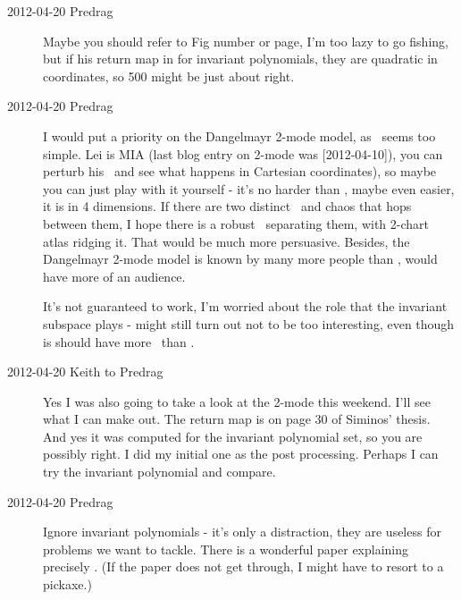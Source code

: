 \begin{description}
\item[2012-04-20 Predrag] Maybe you should refer to Fig number or page,
I'm too lazy to go fishing, but if his return map in for invariant
polynomials, they are quadratic in coordinates, so 500 might be just
about right.

\item[2012-04-20 Predrag] I would put a priority on the Dangelmayr 2-mode
model, as \cLe\ seems too simple. Lei is MIA (last blog entry on 2-mode
was [2012-04-10]), you can perturb his \reqva\ and see what happens in
Cartesian coordinates), so maybe you can just play with it yourself -
it's no harder than \cLe, maybe even easier, it is in 4 dimensions. If
there are two distinct \reqva\ and chaos that hops between them, I hope
there is a robust \chartBord\ separating them, with 2-chart atlas ridging
it. That would be much more persuasive. Besides, the Dangelmayr 2-mode
model is known by many more people than \cLe, would have more of an
audience.

It's not guaranteed to work, I'm worried about the role that the
invariant subspace plays - might still turn out not to be too
interesting, even though is should have more \reqva\ than \cLe.

\item[2012-04-20 Keith to Predrag]  Yes I was also going to take a look
at the 2-mode this weekend.  I'll see what I can make out. The return map
is on page 30 of Siminos' thesis.  And yes it was computed for the
invariant polynomial set, so you are possibly right.  I did my initial
one as the post processing.  Perhaps I can try the invariant polynomial
and compare.

\item[2012-04-20 Predrag] Ignore invariant polynomials - it's only a
distraction, they are useless for problems we want to tackle. There is a
wonderful paper explaining precisely
.
(If the paper does not get through, I might have to resort to a pickaxe.)

\end{description}
